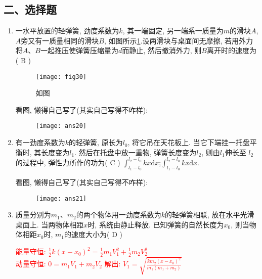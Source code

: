 \subsection*{二、选择题}
\begin{enumerate}
    \item 一水平放置的轻弹簧, 劲度系数为$k$, 其一端固定, 另一端系一质量为$m$的滑块$A$, 
    $A$旁又有一质量相同的滑块$B$, 如图所示\ref{Fig:30}.设两滑块与桌面间无摩擦, 若用外力将$A$、$B$一起推压使弹簧压缩量为$d$而静止, 然后撤消外力, 则$B$离开时的速度为( B )
    \begin{figure}[h]
        \centering
        \texttt{[image: fig30]}
            \caption{如图}\label{Fig:30}
    \end{figure}
    \begin{note}
        看图, 懒得自己写了(其实自己写得不咋样):
    \end{note}
    \begin{figure}[H]
        \centering
        \texttt{[image: ans20]}
    \end{figure}
    \item 有一劲度系数为$k$的轻弹簧, 原长为$l_0$, 将它吊在天花板上. 当它下端挂一托盘平衡时, 其长度变为$l_1$. 然后在托盘中放一重物, 弹簧长度变为$l_2$, 则由$l_1$伸长至
    $l_2$的过程中, 弹性力所作的功为( C )
    {$\displaystyle{\int_{l_1-l_0}^{l_2-l_0}kx\mathrm{d}x}$;}{$\displaystyle{\int_{l_1-l_0}^{l_2-l_0}kx\mathrm{d}x}$.}
    \begin{note}
        看图, 懒得自己写了(其实自己写得不咋样):
    \end{note}
    \begin{figure}[H]
        \centering
        \texttt{[image: ans21]}
    \end{figure}
    \item 质量分别为$m_1$、$m_2$的两个物体用一劲度系数为$k$的轻弹簧相联, 放在水平光滑桌面上. 当两物体相距$x$时, 系统由静止释放. 已知弹簧的自然长度为$x_0$, 则当物体相距$x_0$时, $m_1$的速度大小为( D )
    \begin{note}
        \textcolor{red}{能量守恒: $\frac{1}{2}k(x-x_0)^2=\frac{1}{2}m_1V_1^2+\frac{1}{2}m_2V_2^2$}\\
        \textcolor{red}{动量守恒: $0=m_1V_1+m_2V_2$ 解出: $V_1=\sqrt{\frac{km_2(x-x_0)^2}{m_1(m_1+m_2)}}$}
    \end{note}
\end{enumerate}
